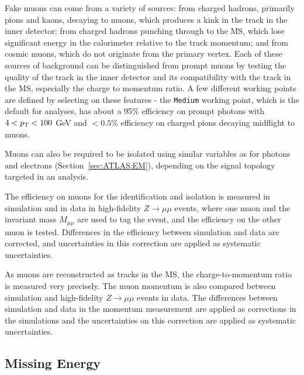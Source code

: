 Fake muons can come from a variety of sources: from charged hadrons, primarily pions and kaons, decaying to muons, which produces a kink in the track in the inner detector; from charged hadrons punching through to the MS, which lose significant energy in the calorimeter relative to the track momentum; and from cosmic muons, which do not originate from the primary vertex.
Each of these sources of background can be distinguished from prompt muons by testing the quality of the track in the inner detector and its compatibility with the track in the MS, especially the charge to momentum ratio.
A few different working points are defined by selecting on these features - the \texttt{Medium} working point, which is the default for analyses, has about a 95\% efficiency on prompt photons with $4<p_{\text{T}}<100$ GeV and $<0.5\%$ efficiency on charged pions decaying midflight to muons.

Muons can also be required to be isolated using similar variables as for photons and electrons (Section~\ref{sec:ATLAS:EM}), depending on the signal topology targeted in an analysis.

The efficiency on muons for the identification and isolation is measured in simulation and in data in high-fidelity $Z\rightarrow \mu\mu$ events, where one muon and the invariant mass $M_{\mu\mu}$ are used to tag the event, and the efficiency on the other muon is tested.
Differences in the efficiency between simulation and data are corrected, and uncertainties in this correction are applied as systematic uncertainties.

As muons are reconstructed as tracks in the MS, the charge-to-momentum ratio is measured very precisely.
The muon momentum is also compared between simulation and high-fidelity $Z\rightarrow \mu\mu$ events in data.
The differences between simulation and data in the momentum measurement are applied as corrections in the simulations and the uncertainties on this correction are applied as systematic uncertainties.

\subsection{Missing Energy}
\label{sec:ATLAS:met}
